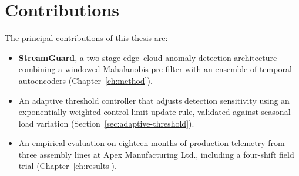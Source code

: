 \section{Contributions}
The principal contributions of this thesis are:
\begin{itemize}[leftmargin=1.6cm]
  \item \textbf{StreamGuard}, a two-stage edge--cloud anomaly detection architecture
        combining a windowed Mahalanobis pre-filter with an ensemble of temporal
        autoencoders (Chapter~\ref{ch:method}).
  \item An adaptive threshold controller that adjusts detection sensitivity using an
        exponentially weighted control-limit update rule, validated against seasonal load
        variation (Section~\ref{sec:adaptive-threshold}).
  \item An empirical evaluation on eighteen months of production telemetry from three
        assembly lines at Apex Manufacturing Ltd., including a four-shift field trial
        (Chapter~\ref{ch:results}).
\end{itemize}
